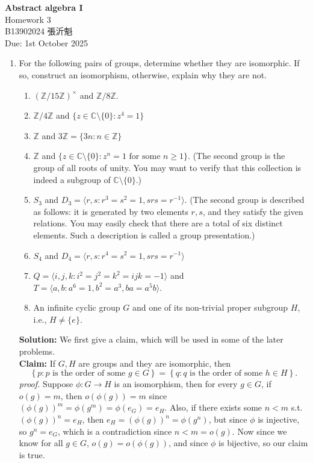 \documentclass[12pt]{article}
\begin{document}
\begin{center}
    \Large \textbf{Abstract algebra I} \\
    \normalsize Homework 3 \\
    B13902024 張沂魁 \\
    Due: 1st October 2025
\end{center}

\begin{enumerate}
    \item For the following pairs of groups, determine whether they are isomorphic. If so, construct an isomorphism, otherwise, explain why they are not.
    \begin{enumerate}
        \item $(\mathbb{Z}/15\mathbb{Z})^{\times}$ and $\mathbb{Z}/8\mathbb{Z}.$
        \item $\mathbb{Z}/4\mathbb{Z}$ and $\{z\in\mathbb{C}\setminus\{0\}:z^{4}=1\}$
        \item $\mathbb{Z}$ and $3\mathbb{Z}=\{3n:n\in\mathbb{Z}\}$
        \item $\mathbb{Z}$ and $\{z\in\mathbb{C}\setminus\{0\}:z^{n}=1 \text{ for some } n\ge1\}$. (The second group is the group of all roots of unity. You may want to verify that this collection is indeed a subgroup of $\mathbb{C}\setminus\{0\}$.)
        \item $S_{3}$ and $D_{3}=\langle r,s:r^{3}=s^{2}=1,srs=r^{-1}\rangle$. (The second group is described as follows: it is generated by two elements $r, s$, and they satisfy the given relations. You may easily check that there are a total of six distinct elements. Such a description is called a group presentation.)
        \item $S_{4}$ and $D_{4}=\langle r,s:r^{4}=s^{2}=1,srs=r^{-1}\rangle$
        \item $Q=\langle i,j,k:i^{2}=j^{2}=k^{2}=ijk=-1\rangle$ and $T = \langle a,b: a^{6} = 1,b^{2} = a^{3}, ba = a^{5}b\rangle$.
        \item An infinite cyclic group $G$ and one of its non-trivial proper subgroup $H$, i.e., $H\ne\{e\}$.
    \end{enumerate}
    \textbf{Solution:} We first give a claim, which will be used in some of the later problems. \\
    \textbf{Claim:} If \(G, H\) are groups and they are isomorphic, then 
    \[
        \left\{ p: p\text{ is the order of some } g \in G \right\} = \left\{ q: q\text{ is the order of some } h \in H \right\}.
    \]
    \textit{proof.} Suppose \(\phi : G \to H\) is an isomorphism, then for every \(g \in G\), if \(o\left( g \right)  = m\), then \(o\left( \phi (g) \right) = m\) since \(\left( \phi (g) \right)^m = \phi \left( g^m \right) = \phi (e_G) = e_H  \). Also, if there exists some \(n < m\) s.t. \(\left( \phi (g) \right)^n = e_H \), then \(e_H = \left( \phi (g) \right)^n = \phi \left( g^n \right)  \), but since \(\phi \) is injective, so \(g^n = e_G\), which is a contradiction since \(n < m = o(g)\). Now since we know for all \(g \in G\), \(o(g) = o\left( \phi (g) \right) \), and since \(\phi \) is bijective, so our claim is true.     

\end{enumerate}
\end{document}
